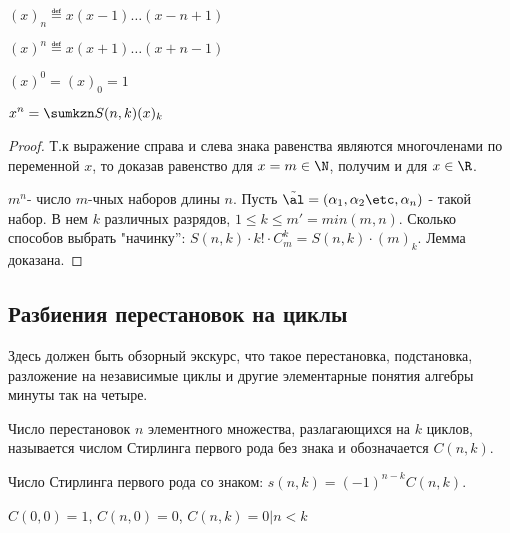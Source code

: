 \documentclass[unicode, 10pt, a4paper, oneside, fleqn]{article}
\begin{document}
\begin{denotes}
  $\displaystyle (x)_n\eqdef x(x-1)\dots(x-n+1)$\par
  $\displaystyle (x)^n\eqdef x(x+1)\dots(x+n-1)$ \par
  $\displaystyle (x)^0=(x)_0=1$
\end{denotes}
\begin{lemma}
$\displaystyle x^n = \sumkzn S(n,k) (x)_k$
\end{lemma}
\begin{proof}
  Т.к выражение справа и слева знака равенства являются многочленами по переменной $x$, 
  то доказав равенство для $x=m\in\N$, получим и для $x\in\R$.\par
  $m^n$- число $m$-чных наборов длины $n$. Пусть $\alt=(\set{n})$ - такой набор.
  В нем $k$ различных разрядов, $1\le k\le m'=min(m,n)$.
  Сколько способов выбрать "начинку'': $S(n,k)\cdot k!\cdot C_m^k  = S(n,k)\cdot (m)_k$.
  Лемма доказана.
\end{proof}
\subsection{Разбиения перестановок на циклы}
\begin{authornote}
  Здесь должен быть обзорный экскурс, что такое перестановка, подстановка, разложение на независимые
  циклы и другие элементарные понятия алгебры минуты так на четыре.
\end{authornote}
\begin{denote}
  Число перестановок $n$ элементного множества, разлагающихся на $k$ циклов, называется 
  числом Стирлинга первого рода без знака и обозначается $C(n,k)$.
\end{denote}
\begin{denote}
  Число Стирлинга первого рода со знаком: $\displaystyle s(n,k) = (-1)^{n-k}C(n,k)$.
\end{denote}
\begin{denote}
  $\displaystyle C(0,0) =1$, $C(n,0) =0$, $C(n,k) = 0|n<k$
\end{denote}
\end{document}

